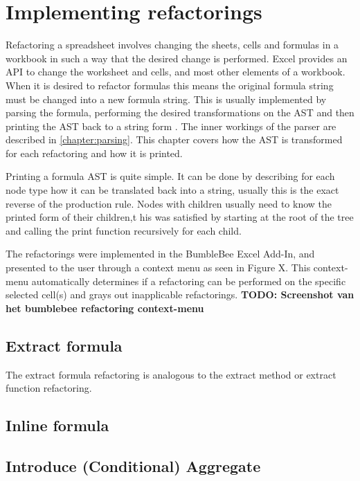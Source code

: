 \documentclass[12pt,a4paper,onecolumn,oneside]{memoir}
\newcommand{\todo}[1]{\textbf{TODO: #1}}
\begin{document}
\chapter{Implementing refactorings}
\label{chapter:implementingrefactorings}

Refactoring a spreadsheet involves changing the sheets, cells and formulas in a workbook in such a way that the desired change is performed.
Excel provides an API to change the worksheet and cells, and most other elements of a workbook.
When it is desired to refactor formulas this means the original formula string must be changed into a new formula string.
This is usually implemented by parsing the formula, performing the desired transformations on the AST and then printing the AST back to a string form \cite{fowler1999refactoring}.
The inner workings of the parser are described in \ref{chapter:parsing}.
This chapter covers how the AST is transformed for each refactoring and how it is printed.

Printing a formula AST is quite simple.
It can be done by describing for each node type how it can be translated back into a string, usually this is the exact reverse of the production rule.
Nodes with children usually need to know the printed form of their children,t his was satisfied by starting at the root of the tree and calling the print function recursively for each child.

The refactorings were implemented in the BumbleBee Excel Add-In, and presented to the user through a context menu as seen in Figure X.
This context-menu automatically determines if a refactoring can be performed on the specific selected cell(s) and grays out inapplicable refactorings.
\todo{Screenshot van het bumblebee refactoring context-menu}

\section{Extract formula}

The extract formula refactoring is analogous to the extract method or extract function refactoring.

\section{Inline formula}

\section{Introduce (Conditional) Aggregate}
\end{document}
